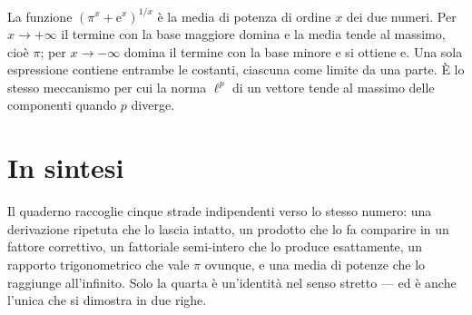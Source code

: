 La funzione $\left(\pi^x+\mathrm{e}^x\right)^{1/x}$ è la media di potenza di ordine $x$ dei due numeri. Per $x\to+\infty$ il termine con la base maggiore domina e la media tende al massimo, cioè $\pi$; per $x\to-\infty$ domina il termine con la base minore e si ottiene $\mathrm{e}$. Una sola espressione contiene entrambe le costanti, ciascuna come limite da una parte. È lo stesso meccanismo per cui la norma $\ell^p$ di un vettore tende al massimo delle componenti quando $p$ diverge.

\section*{In sintesi}

Il quaderno raccoglie cinque strade indipendenti verso lo stesso numero: una derivazione ripetuta che lo lascia intatto, un prodotto che lo fa comparire in un fattore correttivo, un fattoriale semi-intero che lo produce esattamente, un rapporto trigonometrico che vale $\pi$ ovunque, e una media di potenze che lo raggiunge all'infinito. Solo la quarta è un'identità nel senso stretto — ed è anche l'unica che si dimostra in due righe.

